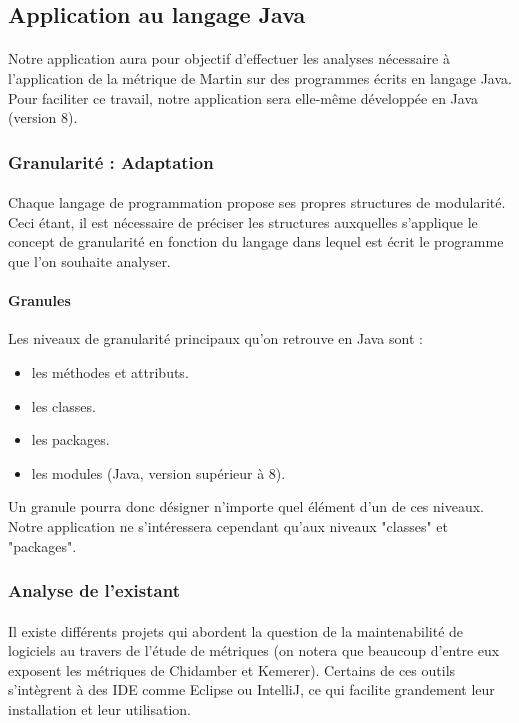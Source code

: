 \documentclass{scrartcl}
\begin{document}
\subsection{Application au langage Java}

    \paragraph{}Notre application aura pour objectif d'effectuer les analyses nécessaire à l'application de la métrique de Martin sur des programmes écrits en langage Java. Pour faciliter ce travail, notre application sera elle-même développée en Java (version 8).

\subsubsection{Granularité : Adaptation}
    
    \paragraph{}Chaque langage de programmation propose ses propres structures de modularité. Ceci étant, il est nécessaire de préciser les structures auxquelles s'applique le concept de granularité en fonction du langage dans lequel est écrit le programme que l'on souhaite analyser.
    
    \paragraph{Granules}Les niveaux de granularité principaux qu'on retrouve en Java sont :
    \begin{itemize}
        \item les méthodes et attributs.
        \item les classes.
        \item les packages.
        \item les modules (Java, version supérieur à 8).
    \end{itemize}
    Un granule pourra donc désigner n'importe quel élément d'un de ces niveaux. Notre application ne s'intéressera cependant qu'aux niveaux "classes" et "packages".

\subsubsection{Analyse de l'existant}
\label{existingAnalysis}
    \paragraph{}Il existe différents projets qui abordent la question de la maintenabilité de logiciels au travers de l'étude de métriques (on notera que beaucoup d'entre eux exposent les métriques de Chidamber et Kemerer\cite{ChidamberKemerer:1994}). Certains de ces outils s'intègrent à des IDE comme Eclipse ou IntelliJ, ce qui facilite grandement leur installation et leur utilisation.
    
\end{document}
